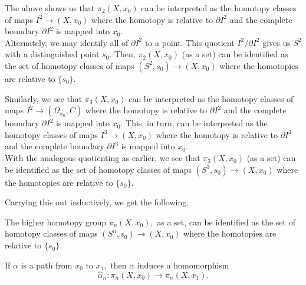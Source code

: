 \documentclass[12pt]{article}
\newenvironment{soln}{\begin{proof}[Solution]}{\end{proof}}
\begin{document}
The above shows us that $\pi_2(X, x_0)$ can be interpreted as the homotopy classes of maps $I^2 \to (X, x_0)$ where the homotopy is relative to $\partial I^2$ and the complete boundary $\partial I^2$ is mapped into $x_0.$\\
Alternately, we may identify all of $\partial I^2$ to a point. This quotient $I^2/\partial I^2$ gives us $S^2$ with a distinguished point $s_0.$ Then, $\pi_2(X, x_0)$ (as a set) can be identified as the set of homotopy classes of maps $(S^2, s_0) \to (X, x_0)$ where the homotopies are relative to $\{s_0\}.$ 

Similarly, we see that $\pi_3(X, x_0)$ can be interpreted as the homotopy classes of maps $I^2 \to (\Omega_{x_0}, C)$ where the homotopy is relative to $\partial I^2$ and the complete boundary $\partial I^2$ is mapped into $x_0.$ This, in turn, can be interpreted as the homotopy classes of maps $I^3 \to (X, x_0)$ where the homotopy is relative to $\partial I^3$ and the complete boundary $\partial I^3$ is mapped into $x_0.$\\
With the analogous quotienting as earlier, we see that $\pi_3(X, x_0)$ (as a set) can be identified as the set of homotopy classes of maps $(S^3, s_0) \to (X, x_0)$ where the homotopies are relative to $\{s_0\}.$ 

Carrying this out inductively, we get the following.

\begin{cor}
	The higher homotopy group $\pi_n(X, x_0),$ as a set, can be identified as the set of homotopy classes of maps $(S^n, s_0) \to (X, x_0)$ where the homotopies are relative to $\{s_0\}.$
\end{cor}

\begin{exe} \label{prop:alphainducesiso2}
	If $\alpha$ is a path from $x_0$ to $x_1,$ then $\alpha$ induces a homomorphism
	\begin{equation*} 
		\hat{\alpha}_n : \pi_n(X, x_0) \to \pi_n(X, x_1).
	\end{equation*}
\end{exe}


\end{document}
